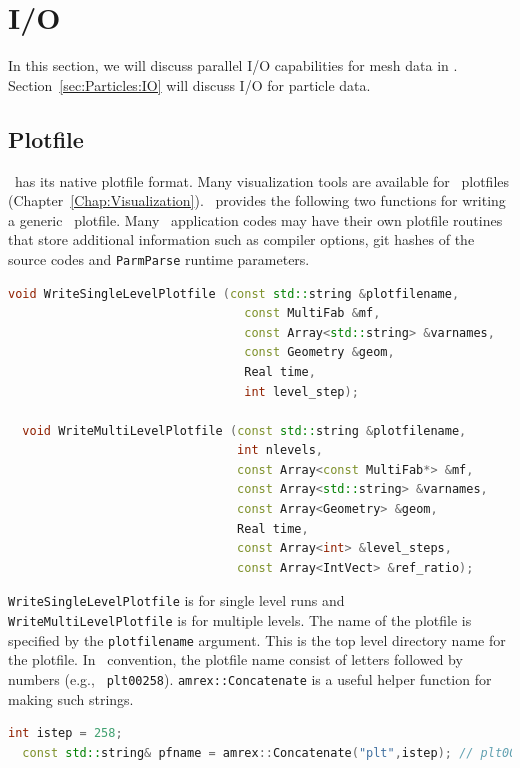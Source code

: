 {{\section{I/O}

In this section, we will discuss parallel I/O capabilities for mesh
data in \amrex.  Section~\ref{sec:Particles:IO} will discuss I/O for
particle data.

\subsection{Plotfile}

\amrex\ has its native plotfile format.  Many visualization tools are
available for \amrex\ plotfiles
(Chapter~\ref{Chap:Visualization}).  \amrex\ provides the following
two functions for writing a generic \amrex\ plotfile.  Many \amrex\
application codes may have their own plotfile routines that store
additional information such as compiler options, git hashes of the
source codes and {\tt ParmParse} runtime parameters.
\begin{lstlisting}[language=cpp]
  void WriteSingleLevelPlotfile (const std::string &plotfilename,
                                 const MultiFab &mf,
                                 const Array<std::string> &varnames,
                                 const Geometry &geom,
                                 Real time,
                                 int level_step);

  void WriteMultiLevelPlotfile (const std::string &plotfilename,
                                int nlevels,
                                const Array<const MultiFab*> &mf,
                                const Array<std::string> &varnames,
                                const Array<Geometry> &geom,
                                Real time,
                                const Array<int> &level_steps,
                                const Array<IntVect> &ref_ratio);
\end{lstlisting}
{\tt WriteSingleLevelPlotfile} is for single level runs and {\tt
WriteMultiLevelPlotfile} is for multiple levels.  The name of the
plotfile is specified by the {\tt plotfilename} argument.  This is the
top level directory name for the plotfile.  In \amrex\ convention, the
plotfile name consist of letters followed by numbers (e.g., {\tt
plt00258}).  {\tt amrex::Concatenate} is a useful helper function for
making such strings.
\begin{lstlisting}[language=cpp]
  int istep = 258;
  const std::string& pfname = amrex::Concatenate("plt",istep); // plt00258


\end{lstlisting}}}
